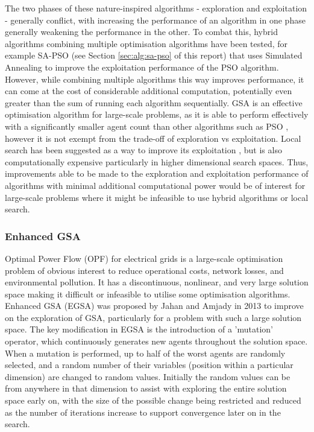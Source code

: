 The two phases of these nature-inspired algorithms - exploration and exploitation - generally conflict, with increasing the performance of an algorithm in one phase generally weakening the performance in the other.
To combat this, hybrid algorithms combining multiple optimisation algorithms have been tested, for example SA-PSO (see Section \ref{sec:alg:sa-pso} of this report) that uses Simulated Annealing to improve the exploitation performance of the PSO algorithm.
However, while combining multiple algorithms this way improves performance, it can come at the cost of considerable additional computation, potentially even greater than the sum of running each algorithm sequentially.
GSA is an effective optimisation algorithm for large-scale problems, as it is able to perform effectively with a significantly smaller agent count than other algorithms such as PSO \cite{EGSA}, however it is not exempt from the trade-off of exploration vs exploitation.
Local search has been suggested as a way to improve its exploitation \cite{GSA}, but is also computationally expensive particularly in higher dimensional search spaces.
Thus, improvements able to be made to the exploration and exploitation performance of algorithms with minimal additional computational power would be of interest for large-scale problems where it might be infeasible to use hybrid algorithms or local search.


\subsubsection{Enhanced GSA}\label{sec:alg:gsa:egsa}
Optimal Power Flow (OPF) for electrical grids is a large-scale optimisation problem of obvious interest to reduce operational costs, network losses, and environmental pollution.
It has a discontinuous, nonlinear, and very large solution space making it difficult or infeasible to utilise some optimisation algorithms.
Enhanced GSA (EGSA) was proposed by Jahan and Amjady \cite{EGSA} in 2013 to improve on the exploration of GSA, particularly for a problem with such a large solution space.
The key modification in EGSA is the introduction of a 'mutation' operator, which continuously generates new agents throughout the solution space.
When a mutation is performed, up to half of the worst agents are randomly selected, and a random number of their variables (position within a particular dimension) are changed to random values.
Initially the random values can be from anywhere in that dimension to assist with exploring the entire solution space early on, with the size of the possible change being restricted and reduced as the number of iterations increase to support convergence later on in the search.

